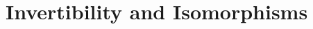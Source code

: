 \section{Invertibility and Isomorphisms}

\begin{exercise}
    \td \\
\end{exercise}

\begin{solution}
    \\ \td \\
\end{solution}